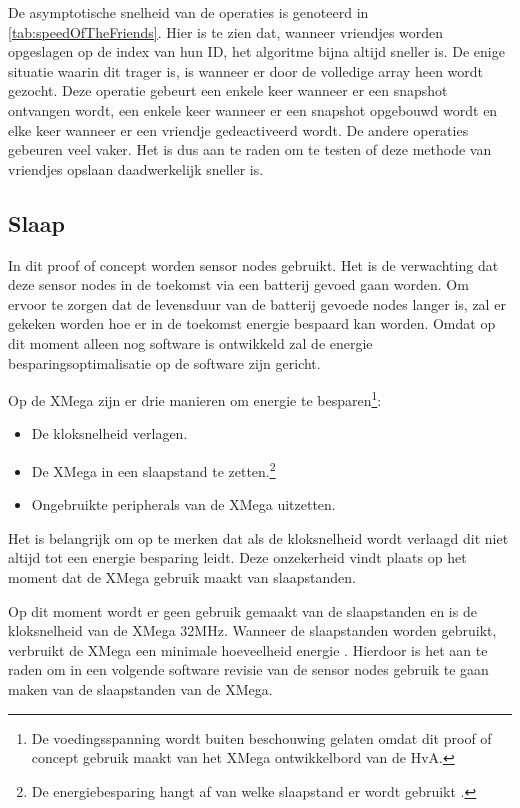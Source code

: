 De asymptotische snelheid van de operaties is genoteerd in \autoref{tab:speedOfTheFriends}. Hier is te zien dat, wanneer vriendjes worden opgeslagen op de index van hun ID, het algoritme bijna altijd sneller is. De enige situatie waarin dit trager is, is wanneer er door de volledige array heen wordt gezocht. Deze operatie gebeurt een enkele keer wanneer er een snapshot ontvangen wordt, een enkele keer wanneer er een snapshot opgebouwd wordt en elke keer wanneer er een vriendje gedeactiveerd wordt. De andere operaties gebeuren veel vaker. Het is dus aan te raden om te testen of deze methode van vriendjes opslaan daadwerkelijk sneller is.

\subsection{Slaap}
In dit proof of concept worden sensor nodes gebruikt. Het is de verwachting dat deze sensor nodes in de toekomst via een batterij gevoed gaan worden. Om ervoor te zorgen dat de levensduur van de batterij gevoede nodes langer is, zal er gekeken worden hoe er in de toekomst energie bespaard kan worden. Omdat op dit moment alleen nog software is ontwikkeld zal de energie besparingsoptimalisatie op de software zijn gericht. 

Op de XMega zijn er drie manieren om energie te besparen\footnote{De voedingsspanning wordt buiten beschouwing gelaten omdat dit proof of concept gebruik maakt van het XMega ontwikkelbord van de HvA.}:
\begin{itemize}
    \item De kloksnelheid verlagen.
    \item De XMega in een slaapstand te zetten.\footnote{De energiebesparing hangt af van welke slaapstand er wordt gebruikt \cite{XMegaDatasheet}.}
    \item Ongebruikte peripherals van de XMega uitzetten.
\end{itemize} 
Het is belangrijk om op te merken dat als de kloksnelheid wordt verlaagd dit niet altijd tot een energie besparing leidt. Deze onzekerheid vindt plaats op het moment dat de XMega gebruik maakt van slaapstanden. 

Op dit moment wordt er geen gebruik gemaakt van de slaapstanden en is de kloksnelheid van de XMega 32MHz. Wanneer de slaapstanden worden gebruikt, verbruikt de XMega een minimale hoeveelheid energie \cite{XMegaDatasheet}. Hierdoor is het aan te raden om in een volgende software revisie van de sensor nodes gebruik te gaan maken van de slaapstanden van de XMega. 

